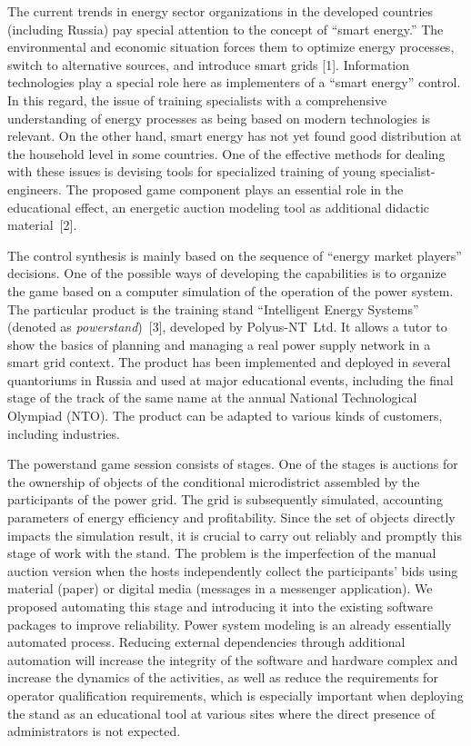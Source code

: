 \documentclass[
]{ceurart}
\begin{document}
The current trends in energy sector organizations in the developed countries (including Russia) pay special attention to the concept of ``smart energy.'' The environmental and economic situation forces them to optimize energy processes, switch to alternative sources, and introduce smart grids [1]. Information technologies play a special role here as implementers of a ``smart energy'' control. In this regard, the issue of training specialists with a comprehensive understanding of energy processes as being based on modern technologies is relevant. On the other hand, smart energy has not yet found good distribution at the household level in some countries. One of the effective methods for dealing with these issues is devising tools for specialized training of young specialist-engineers. The proposed game component plays an essential role in the educational effect, an energetic auction modeling tool as additional didactic material~[2].

The control synthesis is mainly based on the sequence of ``energy market players'' decisions. One of the possible ways of developing the capabilities is to organize the game based on a computer simulation of the operation of the power system. The particular product is the training stand ``Intelligent Energy Systems'' (denoted as \emph{powerstand})~[3], developed by Polyus-NT~Ltd. It allows a tutor to show the basics of planning and managing a real power supply network in a smart grid context. The product has been implemented and deployed in several quantoriums in Russia and used at major educational events, including the final stage of the track of the same name at the annual National Technological Olympiad (NTO). The product can be adapted to various kinds of customers, including industries.

The powerstand game session consists of stages. One of the stages is auctions for the ownership of objects of the conditional microdistrict assembled by the participants of the power grid. The grid is subsequently simulated, accounting parameters of energy efficiency and profitability. Since the set of objects directly impacts the simulation result, it is crucial to carry out reliably and promptly this stage of work with the stand. The problem is the imperfection of the manual auction version when the hosts independently collect the participants' bids using material (paper) or digital media (messages in a messenger application). We proposed automating this stage and introducing it into the existing software packages to improve reliability. Power system modeling is an already essentially automated process. Reducing external dependencies through additional automation will increase the integrity of the software and hardware complex and increase the dynamics of the activities, as well as reduce the requirements for operator qualification requirements, which is especially important when deploying the stand as an educational tool at various sites where the direct presence of administrators is not expected.
\end{document}
